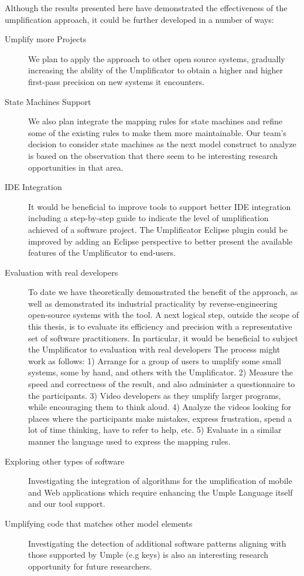 Although the results presented here have demonstrated the effectiveness of the umplification approach, it could be further developed in a number of ways:

\begin{description}
\item[Umplify more Projects] We plan to apply the approach to other open source systems, gradually increasing the ability of the Umplificator to obtain a higher and higher first-pass precision on new systems it encounters.

\item[State Machines Support] We also plan integrate the mapping rules for state machines and refine some of the existing rules to make them more maintainable. Our team's decision to consider state machines as the next model construct to analyze is based on the observation that there seem to be interesting research opportunities in that area.

\item[IDE Integration] It would be beneficial to improve tools to support better IDE integration including a step-by-step guide to indicate the level of umplification achieved of a software project. The Umplificator Eclipse plugin could be improved by adding an Eclipse perspective to better present the available features of the Umplificator to end-users.

\item[Evaluation with real developers] To date we have theoretically demonstrated the benefit of the approach, as well as demonstrated its industrial practicality by  reverse-engineering open-source systems with the tool.  A next logical step, outside the scope of this thesis, is to evaluate its efficiency and precision with a representative set of software practitioners.  In particular,  it would be beneficial to subject the Umplificator to evaluation with real developers The process might work as follows: 1) Arrange for a group of users to umplify some small systems, some by hand, and others with the Umplificator. 2) Measure the speed and correctness of the result, and also administer a questionnaire to the participants. 3) Video developers as they umplify larger programs, while  encouraging them to think aloud. 4) Analyze the videos looking for places where the participants make mistakes, express frustration, spend a lot of time thinking, have to refer to help, etc. 5) Evaluate in a similar manner the language used to express the mapping rules. 

\item[Exploring other types of software] Investigating the integration of algorithms for the umplification of mobile and Web applications which require enhancing the Umple Language itself and our tool support.

\item[Umplifying code that matches other model elements] Investigating the detection of additional software patterns aligning with those supported by Umple (e.g keys) is also an interesting research opportunity for future researchers.

\end{description}